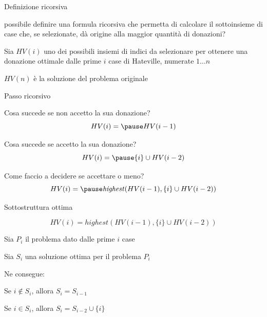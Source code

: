 \begin{frame}{Definizione ricorsiva}

\vspace{-9pt}
\begin{myboxtitle}
\EE possibile definire una formula ricorsiva che permetta di calcolare
il sottoinsieme di case che, se selezionate, dà origine alla maggior quantità di donazioni?
\end{myboxtitle}

\bigskip
{}
\BIL
\item Sia $HV(i)$ uno dei possibili insiemi di indici da selezionare per ottenere una donazione ottimale dalle prime $i$ case di Hateville, numerate $1 \ldots n$ 
\item $HV(n)$ è la soluzione del problema originale
\EIL

\end{frame}

\begin{frame}{Passo ricorsivo}

\vspace{-9pt}
\BI
\item Cosa succede se non accetto la sua donazione?
\EI
\[
HV(i) = \pause HV(i-1)
\]

\BI
\item Cosa succede se accetto la sua donazione?
\EI
\[
HV(i) = \pause \{ i \} \cup HV(i-2)  
\]

\BI
\item Come faccio a decidere se accettare o meno?
\EI
\[
HV(i) = \pause \mathit{highest}(HV(i-1), \{ i \} \cup HV(i-2)  )
\]

\end{frame}

\begin{frame}{Sottostruttura ottima}

\[
HV(i) = \mathit{highest}(HV(i-1), \{ i \} \cup HV(i-2)  )
\]

\pause
\begin{myboxtitle}
\BIL
\item Sia $P_i$ il problema dato dalle prime $i$ case
\item Sia $S_i$ una soluzione ottima per il problema $P_i$
\item Ne consegue:
  \BI
  \item Se $i \not\in S_i$, allora $S_i=S_{i-1}$
  \item Se $i \in S_i$, allora $S_i=S_{i-2} \cup \{i\}$
  \EI
\EIL    
\end{myboxtitle}

\end{frame}


